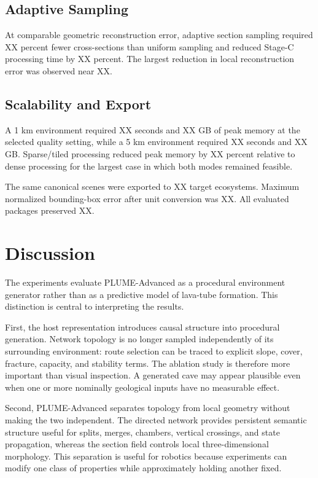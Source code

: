 \documentclass[conference]{IEEEtran}
\begin{document}
\subsection{Adaptive Sampling}

At comparable geometric reconstruction error, adaptive section sampling required XX percent fewer cross-sections than uniform sampling and reduced Stage-C processing time by XX percent. The largest reduction in local reconstruction error was observed near XX.

\subsection{Scalability and Export}

A 1 km environment required XX seconds and XX GB of peak memory at the selected quality setting, while a 5 km environment required XX seconds and XX GB. Sparse/tiled processing reduced peak memory by XX percent relative to dense processing for the largest case in which both modes remained feasible.

The same canonical scenes were exported to XX target ecosystems. Maximum normalized bounding-box error after unit conversion was XX. All evaluated packages preserved XX.

\section{Discussion}

The experiments evaluate PLUME-Advanced as a procedural environment generator rather than as a predictive model of lava-tube formation. This distinction is central to interpreting the results.

First, the host representation introduces causal structure into procedural generation. Network topology is no longer sampled independently of its surrounding environment: route selection can be traced to explicit slope, cover, fracture, capacity, and stability terms. The ablation study is therefore more important than visual inspection. A generated cave may appear plausible even when one or more nominally geological inputs have no measurable effect.

Second, PLUME-Advanced separates topology from local geometry without making the two independent. The directed network provides persistent semantic structure useful for splits, merges, chambers, vertical crossings, and state propagation, whereas the section field controls local three-dimensional morphology. This separation is useful for robotics because experiments can modify one class of properties while approximately holding another fixed.
\end{document}
